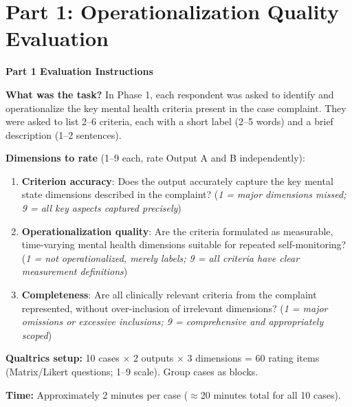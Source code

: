 \documentclass[11pt,a4paper]{article}
\begin{document}
\newpage

\section{Part 1: Operationalization Quality Evaluation}
\label{sec:part1}

\begin{tcolorbox}[colback=PartOneBG,colframe=PrimaryBlue,arc=2.5mm,boxrule=0.9pt,left=10pt,right=10pt,top=9pt,bottom=9pt]
\textbf{\color{PrimaryBlue}Part 1 Evaluation Instructions}

\smallskip
\textbf{What was the task?} In Phase 1, each respondent was asked to identify and operationalize the key mental health criteria present in the case complaint. They were asked to list 2--6 criteria, each with a short label (2--5 words) and a brief description (1--2 sentences).

\textbf{Dimensions to rate} (1--9 each, rate Output A and B independently):
\begin{enumerate}
\item \textbf{Criterion accuracy}: Does the output accurately capture the key mental state dimensions described in the complaint? (\textit{1 = major dimensions missed; 9 = all key aspects captured precisely})
\item \textbf{Operationalization quality}: Are the criteria formulated as measurable, time-varying mental health dimensions suitable for repeated self-monitoring? (\textit{1 = not operationalized, merely labels; 9 = all criteria have clear measurement definitions})
\item \textbf{Completeness}: Are all clinically relevant criteria from the complaint represented, without over-inclusion of irrelevant dimensions? (\textit{1 = major omissions or excessive inclusions; 9 = comprehensive and appropriately scoped})
\end{enumerate}

\textbf{Qualtrics setup:} 10 cases $\times$ 2 outputs $\times$ 3 dimensions = 60 rating items (Matrix/Likert questions; 1--9 scale). Group cases as blocks.

\textbf{Time:} Approximately 2 minutes per case ($\approx$20 minutes total for all 10 cases).
\end{tcolorbox}

\vspace{0.5em}
\end{document}
